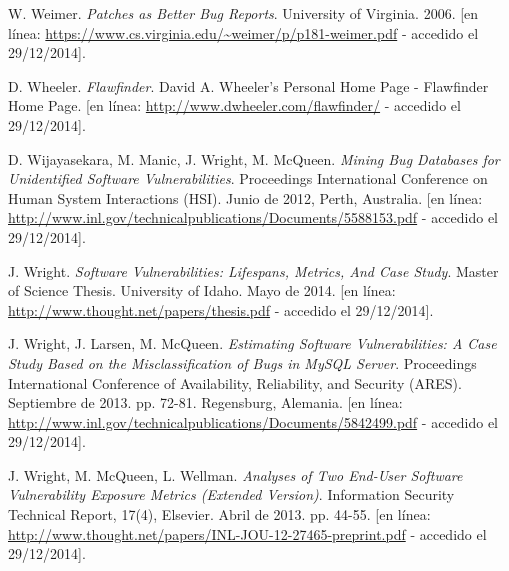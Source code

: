 \documentclass[11pt,a4paper]{article}
\begin{document}
\begin{thebibliography}{99}
	W. Weimer.
	\emph{Patches as Better Bug Reports}.
	University of Virginia. 2006.
	[en línea: \url{https://www.cs.virginia.edu/~weimer/p/p181-weimer.pdf} - accedido el 29/12/2014].

	D. Wheeler.
	\emph{Flawfinder}.
	David A. Wheeler’s Personal Home Page - Flawfinder Home Page.
	[en línea: \url{http://www.dwheeler.com/flawfinder/} - accedido el 29/12/2014].

	 D. Wijayasekara, M. Manic, J. Wright, M. McQueen.
	 \emph{Mining Bug Databases for Unidentified Software Vulnerabilities}.
	 Proceedings International Conference on Human System Interactions (HSI).
	 Junio de 2012, Perth, Australia.
	 [en línea: \url{http://www.inl.gov/technicalpublications/Documents/5588153.pdf} - accedido el 29/12/2014].

	 J. Wright.
	 \emph{Software Vulnerabilities: Lifespans, Metrics, And Case Study}.
	 Master of Science Thesis. University of Idaho.
	 Mayo de 2014.
	 [en línea: \url{http://www.thought.net/papers/thesis.pdf} - accedido el 29/12/2014].

	 J. Wright, J. Larsen, M. McQueen.
	 \emph{Estimating Software Vulnerabilities: A Case Study Based on the Misclassification of Bugs in MySQL Server}.
	 Proceedings International Conference of Availability, Reliability, and Security (ARES).
	 Septiembre de 2013. pp. 72-81. Regensburg, Alemania.
	 [en línea: \url{http://www.inl.gov/technicalpublications/Documents/5842499.pdf} - accedido el 29/12/2014].

	 J. Wright, M. McQueen, L. Wellman.
	 \emph{Analyses of Two End-User Software Vulnerability Exposure Metrics (Extended Version)}.
	 Information Security Technical Report, 17(4), Elsevier.
	 Abril de 2013. pp. 44-55.
	 [en línea: \url{http://www.thought.net/papers/INL-JOU-12-27465-preprint.pdf} - accedido el 29/12/2014].

\end{thebibliography}
\end{document}
